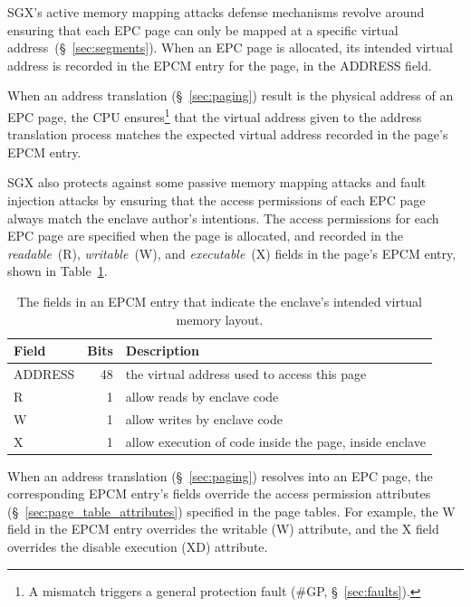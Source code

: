 SGX's active memory mapping attacks defense mechanisms revolve around ensuring
that each EPC page can only be mapped at a specific virtual
address~(\S~\ref{sec:segments}). When an EPC page is allocated, its intended
virtual address is recorded in the EPCM entry for the page, in the ADDRESS
field.

When an address translation (\S~\ref{sec:paging}) result is the physical
address of an EPC page, the CPU ensures\footnote{A mismatch triggers a general
protection fault (\#GP, \S~\ref{sec:faults}).} that the virtual address given
to the address translation process matches the expected virtual address
recorded in the page's EPCM entry.

SGX also protects against some passive memory mapping attacks and fault
injection attacks by ensuring that the access permissions of each EPC page
always match the enclave author's intentions. The access permissions for each
EPC page are specified when the page is allocated, and recorded in the
\textit{readable}~(R), \textit{writable}~(W), and \textit{executable}~(X)
fields in the page's EPCM entry, shown in
Table~\ref{fig:sgx_epcm_access_fields}.

\begin{table}[hbt]
  \centering
  \begin{tabularx}{\columnwidth}{| l | r | X |}
  \hline
  \textbf{Field} & \textbf{Bits} & \textbf{Description}\\
  \hline
  ADDRESS & 48 & the virtual address used to access this page\\
  \hline
  R & 1 & allow reads by enclave code\\
  \hline
  W & 1 & allow writes by enclave code\\
  \hline
  X & 1 & allow execution of code inside the page, inside enclave\\
  \hline
  \end{tabularx}
  \caption{
    The fields in an EPCM entry that indicate the enclave's intended virtual
    memory layout.
  }
  \label{fig:sgx_epcm_access_fields}
\end{table}

When an address translation (\S~\ref{sec:paging}) resolves into an EPC page,
the corresponding EPCM entry's fields override the access permission attributes
(\S~\ref{sec:page_table_attributes}) specified in the page tables. For example,
the W field in the EPCM entry overrides the writable (W) attribute, and the X
field overrides the disable execution (XD) attribute.

